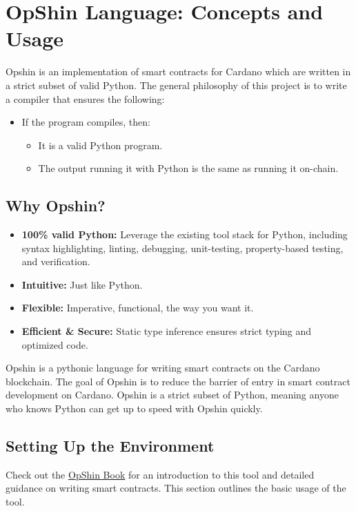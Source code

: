 \section{OpShin Language: Concepts and Usage} \label{sec:Languages}

Opshin is an implementation of smart contracts for Cardano which are written in a strict subset of valid Python. The general philosophy of this project is to write a compiler that ensures the following:

\begin{itemize}
  \item If the program compiles, then:
  \begin{itemize}
    \item It is a valid Python program.
    \item The output running it with Python is the same as running it on-chain.
  \end{itemize}
\end{itemize}

\subsection{Why Opshin?}
\begin{itemize}
  \item \textbf{100\% valid Python:} Leverage the existing tool stack for Python, including syntax highlighting, linting, debugging, unit-testing, property-based testing, and verification.
  \item \textbf{Intuitive:} Just like Python.
  \item \textbf{Flexible:} Imperative, functional, the way you want it.
  \item \textbf{Efficient \& Secure:} Static type inference ensures strict typing and optimized code.
\end{itemize}

Opshin is a pythonic language for writing smart contracts on the Cardano blockchain. The goal of Opshin is to reduce the barrier of entry in smart contract development on Cardano. Opshin is a strict subset of Python, meaning anyone who knows Python can get up to speed with Opshin quickly.

\subsection{Setting Up the Environment}

Check out the \href{https://book.opshin.dev/}{OpShin Book} for an introduction to this tool and detailed guidance on writing smart contracts. This section outlines the basic usage of the tool.

